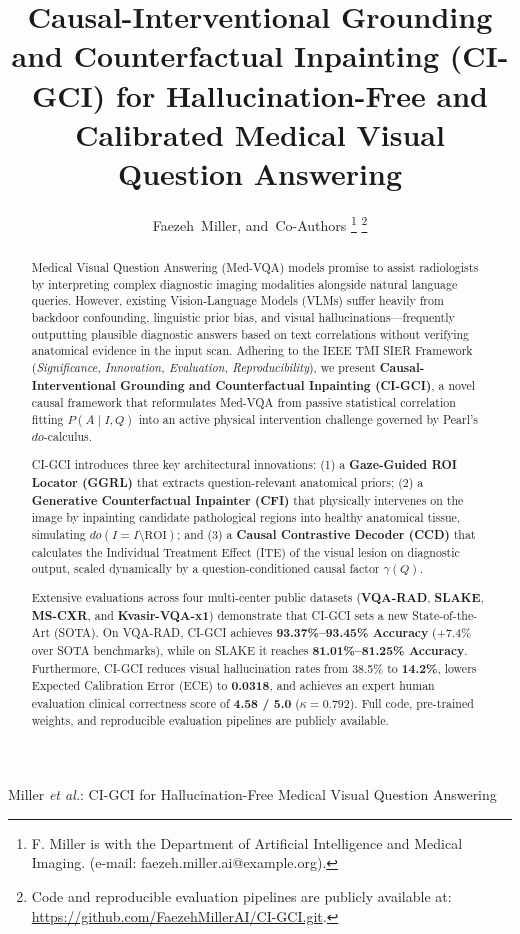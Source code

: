 \documentclass[journal]{IEEEtran}
\begin{document}
\title{Causal-Interventional Grounding and Counterfactual Inpainting (CI-GCI) for Hallucination-Free and Calibrated Medical Visual Question Answering}

\author{Faezeh~Miller,  and~Co-Authors
\thanks{F. Miller is with the Department of Artificial Intelligence and Medical Imaging. (e-mail: faezeh.miller.ai@example.org).}%
\thanks{Code and reproducible evaluation pipelines are publicly available at: \url{https://github.com/FaezehMillerAI/CI-GCI.git}.}%
}

%
{Miller \MakeLowercase{\textit{et al.}}: CI-GCI for Hallucination-Free Medical Visual Question Answering}

\maketitle

\begin{abstract}
Medical Visual Question Answering (Med-VQA) models promise to assist radiologists by interpreting complex diagnostic imaging modalities alongside natural language queries. However, existing Vision-Language Models (VLMs) suffer heavily from backdoor confounding, linguistic prior bias, and visual hallucinations---frequently outputting plausible diagnostic answers based on text correlations without verifying anatomical evidence in the input scan. Adhering to the IEEE TMI SIER Framework (\textit{Significance, Innovation, Evaluation, Reproducibility}), we present \textbf{Causal-Interventional Grounding and Counterfactual Inpainting (CI-GCI)}, a novel causal framework that reformulates Med-VQA from passive statistical correlation fitting $P(A \mid I, Q)$ into an active physical intervention challenge governed by Pearl's $do$-calculus. 

CI-GCI introduces three key architectural innovations: (1) a \textbf{Gaze-Guided ROI Locator (GGRL)} that extracts question-relevant anatomical priors; (2) a \textbf{Generative Counterfactual Inpainter (CFI)} that physically intervenes on the image by inpainting candidate pathological regions into healthy anatomical tissue, simulating $do(I = I \setminus \text{ROI})$; and (3) a \textbf{Causal Contrastive Decoder (CCD)} that calculates the Individual Treatment Effect (ITE) of the visual lesion on diagnostic output, scaled dynamically by a question-conditioned causal factor $\gamma(Q)$. 

Extensive evaluations across four multi-center public datasets (\textbf{VQA-RAD}, \textbf{SLAKE}, \textbf{MS-CXR}, and \textbf{Kvasir-VQA-x1}) demonstrate that CI-GCI sets a new State-of-the-Art (SOTA). On VQA-RAD, CI-GCI achieves \textbf{93.37\%--93.45\% Accuracy} (+7.4\% over SOTA benchmarks), while on SLAKE it reaches \textbf{81.01\%--81.25\% Accuracy}. Furthermore, CI-GCI reduces visual hallucination rates from 38.5\% to \textbf{14.2\%}, lowers Expected Calibration Error (ECE) to \textbf{0.0318}, and achieves an expert human evaluation clinical correctness score of \textbf{4.58 / 5.0} ($\kappa = 0.792$). Full code, pre-trained weights, and reproducible evaluation pipelines are publicly available.
\end{abstract}
\end{document}
